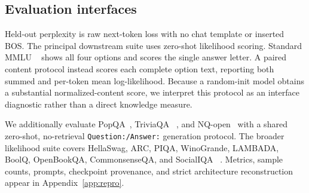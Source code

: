 \subsection{Evaluation interfaces}
Held-out perplexity is raw next-token loss with no chat template or inserted BOS.
The principal downstream suite uses zero-shot likelihood scoring. Standard MMLU
~\citep{hendrycks2021mmlu} shows all four options and scores the single answer
letter. A paired content
protocol instead scores each complete option text, reporting both summed and
per-token mean log-likelihood. Because a random-init model obtains a
substantial normalized-content score, we interpret this protocol as an
interface diagnostic rather than a direct knowledge measure.

We additionally evaluate PopQA~\citep{mallen2023popqa}, TriviaQA
~\citep{joshi2017triviaqa}, and NQ-open~\citep{kwiatkowski2019natural} with a
shared zero-shot, no-retrieval \texttt{Question:/Answer:} generation protocol.
The broader likelihood suite covers HellaSwag, ARC, PIQA, WinoGrande, LAMBADA,
BoolQ, OpenBookQA, CommonsenseQA, and SocialIQA
~\citep{hellaswag,arc,piqa,winogrande,lambada,boolq,openbookqa,
commonsenseqa,socialiqa}. Metrics, sample counts, prompts, checkpoint provenance, and
strict architecture reconstruction appear in Appendix~\ref{app:repro}.
